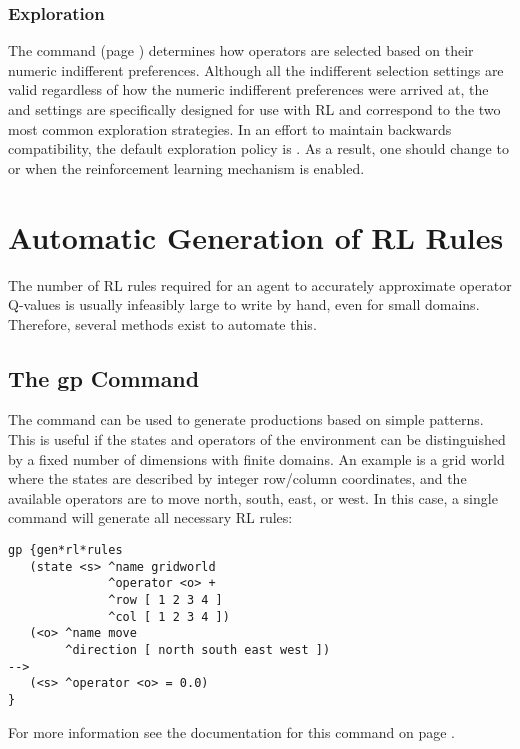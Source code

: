 \subsubsection{Exploration}

The  command (page \pageref{indifferent-selection}) determines how operators are selected based on their numeric indifferent preferences.
Although all the indifferent selection settings are valid regardless of how the numeric indifferent preferences were arrived at, the  and  settings are specifically designed for use with RL and correspond to the two most common exploration strategies.
In an effort to maintain backwards compatibility, the default exploration policy is .
As a result, one should change to  or  when the reinforcement learning mechanism is enabled.

\section{Automatic Generation of RL Rules}

The number of RL rules required for an agent to accurately approximate operator Q-values is usually infeasibly large to write by hand, even for small domains.
Therefore, several methods exist to automate this.

\subsection{The gp Command}
The  command can be used to generate productions based on simple patterns.
This is useful if the states and operators of the environment can be distinguished by a fixed number of dimensions with finite domains.
An example is a grid world where the states are described by integer row/column coordinates, and the available operators are to move north, south, east, or west.
In this case, a single  command will generate all necessary RL rules:
	
\begin{verbatim}
gp {gen*rl*rules
   (state <s> ^name gridworld
              ^operator <o> +
              ^row [ 1 2 3 4 ]
              ^col [ 1 2 3 4 ])
   (<o> ^name move
        ^direction [ north south east west ])
-->
   (<s> ^operator <o> = 0.0)
}
\end{verbatim}
	
For more information see the documentation for this command on page \pageref{gp}.

